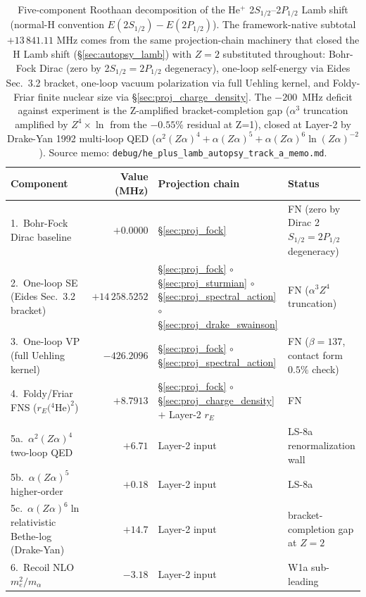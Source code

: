 \documentclass[11pt]{article}
\begin{document}
\begin{table}[h!]
\centering\small
\caption{Five-component Roothaan decomposition of the He$^+$
2$S_{1/2}$--2$P_{1/2}$ Lamb shift (normal-H convention
$E(2S_{1/2}) - E(2P_{1/2})$).  The framework-native subtotal
$+13\,841.11$ MHz comes from the same projection-chain machinery that
closed the H Lamb shift (\S\ref{sec:autopsy_lamb}) with $Z = 2$
substituted throughout: Bohr-Fock Dirac (zero by 2$S_{1/2}=2P_{1/2}$
degeneracy), one-loop self-energy via Eides Sec.~3.2 bracket, one-loop
vacuum polarization via full Uehling kernel, and Foldy-Friar finite
nuclear size via \S\ref{sec:proj_charge_density}.  The $-200$~MHz
deficit against experiment is the Z-amplified bracket-completion gap
($\alpha^3$ truncation amplified by $Z^4 \times \ln$ from the $-0.55\%$
residual at Z=1), closed at Layer-2 by Drake-Yan 1992 multi-loop QED
($\alpha^2(Z\alpha)^4 + \alpha(Z\alpha)^5 + \alpha(Z\alpha)^6
\ln(Z\alpha)^{-2}$).  Source memo:
\texttt{debug/he\_plus\_lamb\_autopsy\_track\_a\_memo.md}.}
\label{tab:autopsy_he_plus_lamb}
\begin{tabular}{p{5.5cm} r p{4.7cm} l}
\toprule
Component & Value (MHz) & Projection chain & Status \\
\midrule
1.~Bohr-Fock Dirac baseline & $+0.0000$ &
\S\ref{sec:proj_fock} & FN (zero by Dirac 2$S_{1/2}=2P_{1/2}$ degeneracy) \\
2.~One-loop SE (Eides Sec.~3.2 bracket) & $+14\,258.5252$ &
\S\ref{sec:proj_fock} $\circ$ \S\ref{sec:proj_sturmian} $\circ$
\S\ref{sec:proj_spectral_action} $\circ$ \S\ref{sec:proj_drake_swainson}
& FN ($\alpha^3 Z^4$ truncation) \\
3.~One-loop VP (full Uehling kernel) & $-426.2096$ &
\S\ref{sec:proj_fock} $\circ$ \S\ref{sec:proj_spectral_action}
& FN ($\beta = 137$, contact form $0.5\%$ check) \\
4.~Foldy/Friar FNS ($r_E({}^4$He$)^2$) & $+8.7913$ &
\S\ref{sec:proj_fock} $\circ$ \S\ref{sec:proj_charge_density} $+$
Layer-2 $r_E$ & FN \\
5a.~$\alpha^2(Z\alpha)^4$ two-loop QED & $+6.71$ &
Layer-2 input & LS-8a renormalization wall \\
5b.~$\alpha(Z\alpha)^5$ higher-order & $+0.18$ &
Layer-2 input & LS-8a \\
5c.~$\alpha(Z\alpha)^6 \ln$ relativistic Bethe-log (Drake-Yan)
& $+14.7$ & Layer-2 input & bracket-completion gap at $Z = 2$ \\
6.~Recoil NLO $m_e^2/m_\alpha$ & $-3.18$ &
Layer-2 input & W1a sub-leading \\

\end{tabular}
\end{table}
\end{document}
